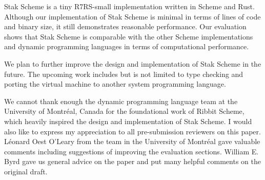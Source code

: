 \documentclass[sigplan]{acmart}
\begin{document}
Stak Scheme is a tiny R7RS-small implementation written in Scheme and
Rust.
Although our implementation of Stak Scheme is minimal in terms of
lines of code and binary size, it still demonstrates reasonable performance.
Our evaluation shows that Stak Scheme is
comparable with the other Scheme implementations and dynamic
programming languages in terms of computational performance.

We plan to further improve the design and implementation of Stak
Scheme in the future. The upcoming work includes but is not limited
to type checking and porting the virtual machine to
another system programming language.

\begin{acks}
  We cannot thank enough the dynamic programming language team at the
  University of Montréal, Canada for the foundational work of Ribbit
  Scheme, which heavily inspired the design and implementation of
  Stak Scheme.
  I would also like to express my appreciation to all pre-submission
  reviewers on this paper.
  Léonard Oest O'Leary from the team in the University of Montréal gave
  valuable comments including suggestions of improving the
  evaluation sections.
  William E. Byrd gave us general advice on the paper and put many helpful
  comments on the original draft.
\end{acks}



\end{document}
